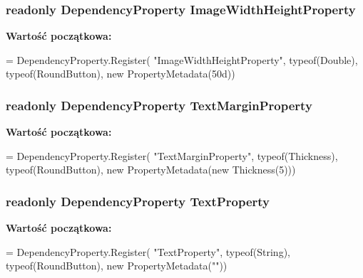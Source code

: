 \subsubsection[{Image\+Width\+Height\+Property}]{\setlength{\rightskip}{0pt plus 5cm}readonly Dependency\+Property Image\+Width\+Height\+Property\hspace{0.3cm}{\ttfamily [static]}}\label{a00050_a93ac0b8125606ef13cf6961a1b5ea8ab}
{\bfseries Wartość początkowa\+:}
\begin{DoxyCode}
=
        DependencyProperty.Register(
            \textcolor{stringliteral}{"ImageWidthHeightProperty"},
            typeof(Double),
            typeof(RoundButton),
            \textcolor{keyword}{new} PropertyMetadata(50d))
\end{DoxyCode}
\hypertarget{a00050_a115a2be280e3dafb5728fc4c29059418}{}
\subsubsection[{Text\+Margin\+Property}]{\setlength{\rightskip}{0pt plus 5cm}readonly Dependency\+Property Text\+Margin\+Property\hspace{0.3cm}{\ttfamily [static]}}\label{a00050_a115a2be280e3dafb5728fc4c29059418}
{\bfseries Wartość początkowa\+:}
\begin{DoxyCode}
=
        DependencyProperty.Register(
            \textcolor{stringliteral}{"TextMarginProperty"},
            typeof(Thickness),
            typeof(RoundButton),
            \textcolor{keyword}{new} PropertyMetadata(\textcolor{keyword}{new} Thickness(5)))
\end{DoxyCode}
\hypertarget{a00050_aad70695cc61c63378bc1f6ed5d5e3097}{}
\subsubsection[{Text\+Property}]{\setlength{\rightskip}{0pt plus 5cm}readonly Dependency\+Property Text\+Property\hspace{0.3cm}{\ttfamily [static]}}\label{a00050_aad70695cc61c63378bc1f6ed5d5e3097}
{\bfseries Wartość początkowa\+:}
\begin{DoxyCode}
=
        DependencyProperty.Register(
            \textcolor{stringliteral}{"TextProperty"},
            typeof(String),
            typeof(RoundButton),
            \textcolor{keyword}{new} PropertyMetadata(\textcolor{stringliteral}{""}))
\end{DoxyCode}


